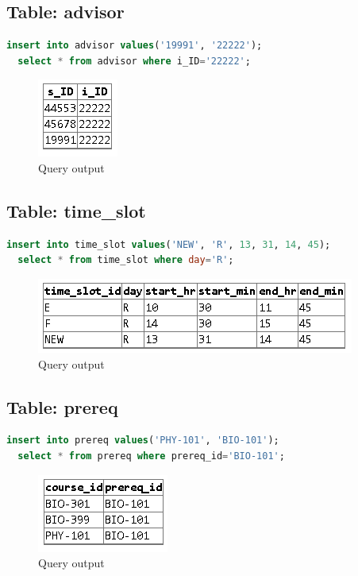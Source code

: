 \documentclass{article}
\begin{document}
\subsection{Table: advisor}
\begin{lstlisting}[language=sql]
  insert into advisor values('19991', '22222');
  select * from advisor where i_ID='22222';
\end{lstlisting}
\begin{figure}[!ht]
  \begin{center}
  \includegraphics[scale=1]{adv.png}
  \caption{Query output}
  \end{center}
\end{figure}

\subsection{Table: time\_slot}
\begin{lstlisting}[language=sql]
  insert into time_slot values('NEW', 'R', 13, 31, 14, 45);
  select * from time_slot where day='R';
\end{lstlisting}
\begin{figure}[!ht]
  \begin{center}
  \includegraphics[scale=1]{time_slot.png}
  \caption{Query output}
  \end{center}
\end{figure}

\subsection{Table: prereq}
\begin{lstlisting}[language=sql]
  insert into prereq values('PHY-101', 'BIO-101');
  select * from prereq where prereq_id='BIO-101';
\end{lstlisting}
\begin{figure}[!ht]
  \begin{center}
  \includegraphics[scale=1]{ew.png}
  \caption{Query output}
  \end{center}
\end{figure}
\end{document}
